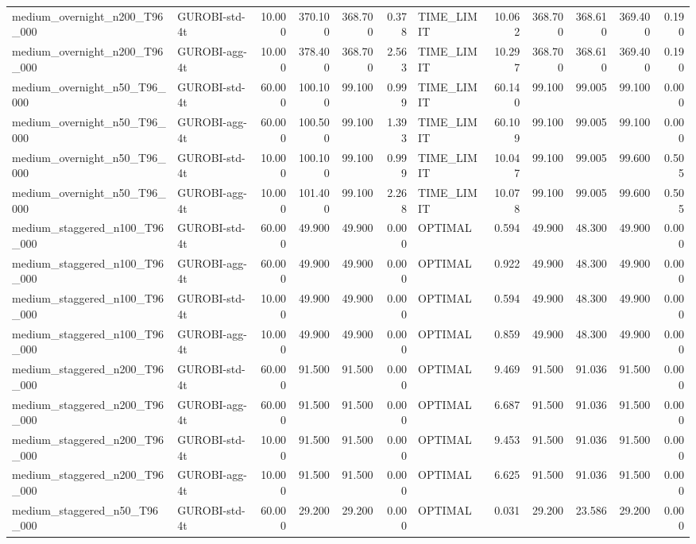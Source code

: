 \begin{table}[htbp]
\begin{tabular}{llrrrrlrrrrr}
medium\_overnight\_n200\_T96\_000 & GUROBI-std-4t & 10.000 & 370.100 & 368.700 & 0.378 & TIME\_LIMIT & 10.062 & 368.700 & 368.610 & 369.400 & 0.190 \\
medium\_overnight\_n200\_T96\_000 & GUROBI-agg-4t & 10.000 & 378.400 & 368.700 & 2.563 & TIME\_LIMIT & 10.297 & 368.700 & 368.610 & 369.400 & 0.190 \\
medium\_overnight\_n50\_T96\_000 & GUROBI-std-4t & 60.000 & 100.100 & 99.100 & 0.999 & TIME\_LIMIT & 60.140 & 99.100 & 99.005 & 99.100 & 0.000 \\
medium\_overnight\_n50\_T96\_000 & GUROBI-agg-4t & 60.000 & 100.500 & 99.100 & 1.393 & TIME\_LIMIT & 60.109 & 99.100 & 99.005 & 99.100 & 0.000 \\
medium\_overnight\_n50\_T96\_000 & GUROBI-std-4t & 10.000 & 100.100 & 99.100 & 0.999 & TIME\_LIMIT & 10.047 & 99.100 & 99.005 & 99.600 & 0.505 \\
medium\_overnight\_n50\_T96\_000 & GUROBI-agg-4t & 10.000 & 101.400 & 99.100 & 2.268 & TIME\_LIMIT & 10.078 & 99.100 & 99.005 & 99.600 & 0.505 \\
medium\_staggered\_n100\_T96\_000 & GUROBI-std-4t & 60.000 & 49.900 & 49.900 & 0.000 & OPTIMAL & 0.594 & 49.900 & 48.300 & 49.900 & 0.000 \\
medium\_staggered\_n100\_T96\_000 & GUROBI-agg-4t & 60.000 & 49.900 & 49.900 & 0.000 & OPTIMAL & 0.922 & 49.900 & 48.300 & 49.900 & 0.000 \\
medium\_staggered\_n100\_T96\_000 & GUROBI-std-4t & 10.000 & 49.900 & 49.900 & 0.000 & OPTIMAL & 0.594 & 49.900 & 48.300 & 49.900 & 0.000 \\
medium\_staggered\_n100\_T96\_000 & GUROBI-agg-4t & 10.000 & 49.900 & 49.900 & 0.000 & OPTIMAL & 0.859 & 49.900 & 48.300 & 49.900 & 0.000 \\
medium\_staggered\_n200\_T96\_000 & GUROBI-std-4t & 60.000 & 91.500 & 91.500 & 0.000 & OPTIMAL & 9.469 & 91.500 & 91.036 & 91.500 & 0.000 \\
medium\_staggered\_n200\_T96\_000 & GUROBI-agg-4t & 60.000 & 91.500 & 91.500 & 0.000 & OPTIMAL & 6.687 & 91.500 & 91.036 & 91.500 & 0.000 \\
medium\_staggered\_n200\_T96\_000 & GUROBI-std-4t & 10.000 & 91.500 & 91.500 & 0.000 & OPTIMAL & 9.453 & 91.500 & 91.036 & 91.500 & 0.000 \\
medium\_staggered\_n200\_T96\_000 & GUROBI-agg-4t & 10.000 & 91.500 & 91.500 & 0.000 & OPTIMAL & 6.625 & 91.500 & 91.036 & 91.500 & 0.000 \\
medium\_staggered\_n50\_T96\_000 & GUROBI-std-4t & 60.000 & 29.200 & 29.200 & 0.000 & OPTIMAL & 0.031 & 29.200 & 23.586 & 29.200 & 0.000 \\

\end{tabular}
\end{table}

